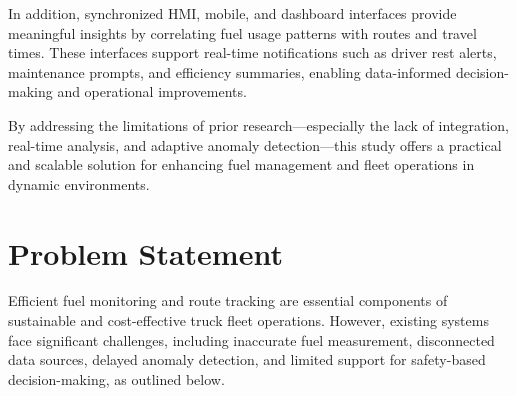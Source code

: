 In addition, synchronized HMI, mobile, and dashboard interfaces provide meaningful insights by correlating fuel usage patterns with routes and travel times. These interfaces support real-time notifications such as driver rest alerts, maintenance prompts, and efficiency summaries, enabling data-informed decision-making and operational improvements.

By addressing the limitations of prior research—especially the lack of integration, real-time analysis, and adaptive anomaly detection—this study offers a practical and scalable solution for enhancing fuel management and fleet operations in dynamic environments.

\section{Problem Statement}

Efficient fuel monitoring and route tracking are essential components of sustainable and cost-effective truck fleet operations. However, existing systems face significant challenges, including inaccurate fuel measurement, disconnected data sources, delayed anomaly detection, and limited support for safety-based decision-making, as outlined below.

